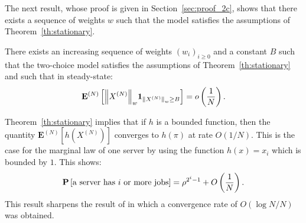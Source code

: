 \documentclass[sigconf]{acmart}
\newcommand\XN{X^{(N)}}
\newcommand\espN[1]{{\mathchoice{\bespN{#1}}{\sespN{#1}}{\sespN{#1}}{\sespN{#1}}}}
\newcommand\bespN[1]{\mathbf{E}^{(N)}\left[#1\right]}
\newcommand\sespN[1]{\mathbf{E}^{(N)}[#1]}
\newcommand\Proba[1]{{\mathchoice{\bProba{#1}}{\sProba{#1}}{\sProba{#1}}{\sProba{#1}}}}
\newcommand\bProba[1]{\mathbf{P}\left[#1\right]}
\newcommand\sProba[1]{\mathbf{P}[#1]}
\newcommand\norm[1]{{\mathchoice{\bnorm{#1}}{\snorm{#1}}{\snorm{#1}}{\snorm{#1}}}}
\newcommand\bnorm[1]{\left\|#1\right\|}
\newcommand\snorm[1]{\|#1\|}
\newcommand\p[1]{\left(#1\right)}
\begin{document}
The next result, whose proof is given in Section~\ref{sec:proof_2c},
shows that there exists a sequence of weights $w$ such that the model
satisfies the assumptions of
Theorem~\ref{th:stationary}. 
\begin{theorem}
  \label{th:two-choice}
  There exists an increasing sequence of weights $(w_i)_{i\ge0}$ and a
  constant $B$ such that the two-choice model satisfies the
  assumptions of Theorem~\ref{th:stationary} and such that in
  steady-state:
  \begin{align}
    \label{eq:bound_2c}
    \espN{\norm{\XN}_w\mathbf{1}_{\norm{\XN}_w\ge B}}=o\p{\frac1{N}}.
  \end{align}
\end{theorem}

Theorem~\ref{th:stationary} implies that if $h$ is a bounded function,
then the quantity $\sespN{h(\XN)}$ converges to $h(\pi)$ at rate
$O(1/N)$. This is the case for the marginal law of one server by using
the function $h(x)=x_i$ which is bounded by $1$. This shows:
\begin{align*}
  \Proba{\text{a server has $i$ or more jobs}} = \rho^{2^i-1} +
  O\p{\frac1N}. 
\end{align*}
This result sharpens the result of \cite{luczak2007asymptotic} in
which a convergence rate of $O(\log N/N)$ was obtained. 
\end{document}
